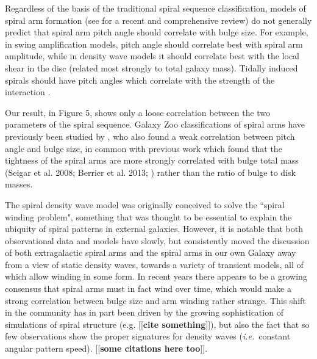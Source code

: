 \documentclass[usenatbib]{mn2e}
\newcommand{\ie}{{\it i.e.}}
\newcommand{\comment}[2][todo]{{\color{#1}[[{\bf #2}]]}}
\begin{document}
 Regardless of the basis of the traditional spiral sequence classification, models of spiral arm formation (see \citealt{DobbsBaba2014} for a recent and comprehensive review) do not generally predict that spiral arm pitch angle should correlate with bulge size. For example, in swing amplification models, pitch angle should correlate best with spiral arm amplitude, while in density wave models it should correlate best with the local shear in the disc (related most strongly to total galaxy mass). Tidally induced spirals should have pitch angles which correlate with the strength of the interaction \citep{Kendall2011}. %
 
 Our result, in Figure 5, shows only a loose correlation between the two parameters of the spiral sequence. Galaxy Zoo classifications of spiral arms have previously been studied by \citet{Hart2017b}, who also found a weak correlation between pitch angle and bulge size, in common with previous work which found that the tightness of the spiral arms are more strongly correlated with bulge total mass (Seigar et al. 2008; Berrier et al. 2013; \citealt{Davis2015}) rather than the ratio of bulge to disk masses. %

% 



The spiral density wave model \citep{LinShu1964} was originally conceived to solve the ``spiral winding problem", something that was thought to be essential to explain the ubiquity of spiral patterns in external galaxies. However, it is notable that both observational data and models have slowly, but consistently moved the discussion of both extragalactic spiral arms \citep{2013ApJ...766...34D} and the spiral arms in our own Galaxy \citep{hunt2018} away from a view of static density waves, towards a variety of transient models, all of which allow winding in some form. In recent years there appears to be a growing consensus that spiral arms must in fact wind over time, which would make a strong correlation between bulge size and arm winding rather strange. This shift in the community has in part been driven by the growing sophistication of simulations of spiral structure (e.g. \comment{cite something}), but also the fact that so few observations show the proper signatures for density waves (\ie ~constant angular pattern speed). \comment{some citations here too}. 
\end{document}
